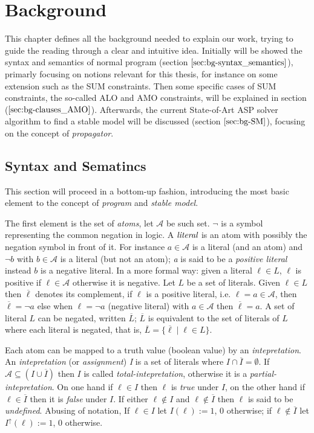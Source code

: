 \chapter{Background}

This chapter defines all the background needed to explain our work,
trying to guide the reading through a clear and intuitive idea.
Initially will be showed the syntax and semantics of normal
program (section $\ref{sec:bg-syntax_semantics}$),
primarly focusing on notions relevant for this thesis, for instance on some
extension such as the SUM constraints.
Then some specific cases of SUM constraints, the so-called ALO and AMO constraints, 
will be explained in section ($\ref{sec:bg-clauses_AMO}$).
Afterwards, the current State-of-Art ASP solver algorithm to find a stable model 
will be discussed (section $\ref{sec:bg-SM}$), focusing on the concept of \textit{propagator}.

\section{Syntax and Sematincs}
\label{sec:bg-syntax_semantics}

This section will proceed in a bottom-up fashion, introducing the 
most basic element to the concept of \textit{program}
and \textit{stable model}.

The first element is the set of \textit{atoms}, let $\mathcal{A}$ be such set.
$\neg$ is a symbol representing the common negation in logic.
A $\emph{literal}$ is an atom with possibly the negation symbol in front of it.
For instance $a \in \mathcal{A}$ is a literal (and an atom) and $\neg b$ with $b \in \mathcal{A}$
is a literal (but not an atom); \textit{a} is said to be a \textit{positive literal} instead
$b$ is a negative literal. In a more formal way: given a literal $\ell \in L$, $\ell$ is 
positive if $\ell \in \mathcal{A}$ otherwise it is negative. Let $L$ be a set of literals.
Given $\ell \in L$ then $\overline{\ell}$ denotes its complement, if $\ell$ is a positive
literal, i.e. $\ell = a \in \mathcal{A}$, then $\overline{\ell} = \neg a$ else 
when $\ell = \neg a$ (negative literal) with $a \in \mathcal{A}$ then $\overline{\ell} = a$.
A set of literal $L$ can be negated, written $\overline{L}$;
$\overline{L}$ is equivalent to the set of literals of $L$ where each literal is negated,
that is, $\overline{L} = \{ \overline{\ell} \mid \ell \in L \}$.

Each atom can be mapped to a truth value (boolean value) by an \textit{intepretation}.
An \textit{intepretation} (or \textit{assignment}) \textit{I} is a set of 
literals where $I \cap \overline{I} = \emptyset$.
If $\mathcal{A} \subseteq (I \cup \overline{I})$ then $I$ is called \textit{total-intepretation},
otherwise it is a \textit{partial-intepretation}.
On one hand if $\ell \in I$ then $\ell$ is \textit{true} under $I$, on the other hand 
if $\ell \in \overline{I}$ then it is \textit{false} under $I$.
If either $\ell \not\in I$ and $\ell \not\in \overline{I}$ then $\ell$ is said to be \textit{undefined}. 
Abusing of notation, If $\ell \in I$ let $I(\ell) := 1$, 0 otherwise;
if $\ell \not\in \overline{I}$ let $I^\uparrow(\ell) := 1$, 0 otherwise.

